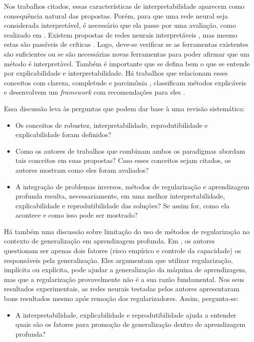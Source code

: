 Nos trabalhos citados, essas características de interpretabilidade aparecem como consequência natural das propostas. Porém, para que uma rede neural seja considerada interpretável, é necessário que ela passe por uma avaliação, como realizado em \cite{Margot2021, Meng2022, Molnar2022}. Existem propostas de redes neurais interpretáveis \cite{Du2019}, mas mesmo estas são passíveis de críticas \cite{Zhang2020}. Logo, deve-se verificar se as ferramentas existentes são suficientes ou se são necessárias novas ferramentas para poder afirmar que um método é interpretável. Também é importante que se defina bem o que se entende por explicabilidade e  interpretabilidade. Há trabalhos que relacionam esses conceitos com clareza, completude e parcimônia \cite[Figura 1]{Markus2021}, classificam métodos explicáveis \cite[Tabela 1]{Markus2021} e desenvolvem um  \textit{framework} com recomendações para eles \cite[Figura 2]{Markus2021}. 

Essa discussão leva às perguntas que podem dar base à uma revisão sistemática: 
\begin{itemize}
\item Os conceitos de robustez, interpretabilidade, reprodutibilidade e explicabilidade foram definidos? 
\item Como os autores de trabalhos que combinam ambos os paradigmas abordam tais conceitos em suas propostas? Caso esses conceitos sejam citados, os autores mostram como eles foram avaliados?
\item A integração de problemas inversos, métodos de regularização e aprendizagem profunda resulta, necessariamente, em uma melhor interpretabilidade, explicabilidade e reprodutibilidade das soluções?  Se assim for, como ela acontece e como isso pode ser mostrado?
\end{itemize}


Há também uma discussão sobre limitação do uso de métodos de regularização no contexto de generalização em aprendizagem profunda. Em   \cite{2021Zhang}, os autores questionam ser apenas dois fatores (risco empírico e controle da capacidade) os responsáveis pela generalização. Eles argumentam que utilizar regularização, implícita ou explícita, pode ajudar a generalização da máquina de aprendizagem, mas que a regularização provavelmente não é a sua razão fundamental. Nos seus resultados experimentais, as redes neurais testadas pelos autores apresentaram bons resultados mesmo após remoção dos regularizadores. Assim, pergunta-se:
\begin{itemize}
\item A interpretabilidade, explicabilidade e reprodutibilidade ajuda a entender quais são os fatores para promoção de generalização dentro de aprendizagem profunda?
\end{itemize}

